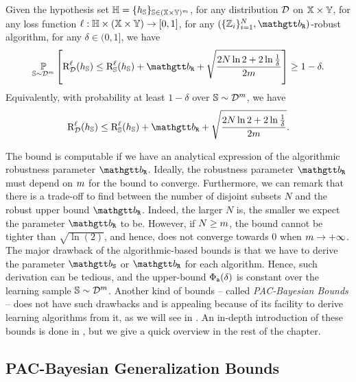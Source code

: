 \begin{theorem}
Given the hypothesis set $\mathbb{H} = \{h_{\mathbb{S}}\}_{\mathbb{S}\in(\mathbb{X}{\times}\mathbb{Y})^m}$, for any distribution $\mathcal{D}$ on $\mathbb{X}\times\mathbb{Y}$, for any loss function $\ell: \mathbb{H}\times(\mathbb{X}\times\mathbb{Y}) \to [0,1]$, for any $(\{\Z_i\}_{i=1}^N, \rob)$-robust algorithm, for any $\delta\in(0,1]$, we have 
\begin{align*}
    \PP_{\S\sim\D^\m}\LB\RiskLoss_{\D}(\h_\S) \le \RiskLoss_{\S}(\h_\S) + \rob + \sqrt{\frac{2N\ln2+ 2\ln\frac{1}{\delta}}{2\m}}\RB\ge 1-\delta.
\end{align*}
Equivalently, with probability at least $1-\delta$ over $\mathbb{S}\sim\mathcal{D}^m$, we have
\begin{align*}
\RiskLoss_{\D}(\h_\S) \le \RiskLoss_{\S}(\h_\S) + \rob + \sqrt{\frac{2N\ln2+ 2\ln\frac{1}{\delta}}{2\m}}.
\end{align*}
\end{theorem}

The bound is computable if we have an analytical expression of the algorithmic robustness parameter $\rob$.
Ideally, the robustness parameter $\rob$ must depend on $m$ for the bound to converge.
Furthermore, we can remark that there is a trade-off to find between the number of disjoint subsets $N$ and the robust upper bound $\rob$.  
Indeed, the larger $N$ is, the smaller we expect the parameter $\rob$ to be.
However, if $N \ge m$, the bound cannot be tighter than $\sqrt{\ln(2)}$, and hence, does not converge towards $0$ when $m\rightarrow+\infty$.\\

The major drawback of the algorithmic-based bounds is that we have to derive the parameter $\stab$ or $\rob$ for each algorithm.
Hence, such derivation can be tedious, and the upper-bound $\Phi_{{\tt a}}(\delta)$ is constant over the learning sample $\mathbb{S}\sim\mathcal{D}^m$.
Another kind of bounds -- called {\it PAC-Bayesian Bounds} -- does not have such drawbacks and is appealing because of its facility to derive learning algorithms from it, as we will see in .  
An in-depth introduction of these bounds is done in , but we give a quick overview in the rest of the chapter.

\subsection{PAC-Bayesian Generalization Bounds}

